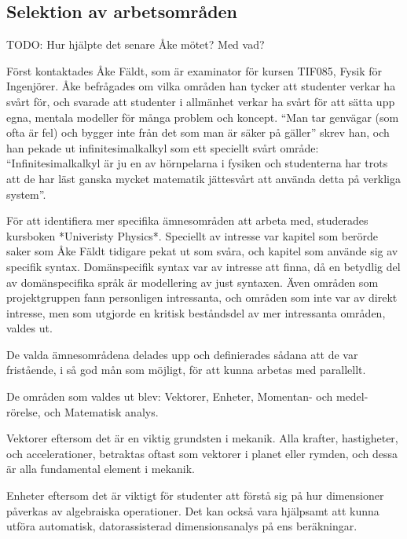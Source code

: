 \begin{binge}
\section{Selektion av arbetsområden}

TODO: Hur hjälpte det senare Åke mötet? Med vad?

\begin{draft}
  Först kontaktades Åke Fäldt, som är examinator för kursen TIF085,
  Fysik för Ingenjörer. Åke befrågades om vilka områden han tycker att
  studenter verkar ha svårt för, och svarade att studenter i allmänhet
  verkar ha svårt för att sätta upp egna, mentala modeller för många
  problem och koncept. ``Man tar genvägar (som ofta är fel) och bygger
  inte från det som man är säker på gäller'' skrev han, och han pekade
  ut infinitesimalkalkyl som ett speciellt svårt område:
  ``Infinitesimalkalkyl är ju en av hörnpelarna i fysiken och
  studenterna har trots att de har läst ganska mycket matematik
  jättesvårt att använda detta på verkliga system''.

  För att identifiera mer specifika ämnesområden att arbeta med,
  studerades kursboken *Univeristy Physics*. Speciellt av intresse var
  kapitel som berörde saker som Åke Fäldt tidigare pekat ut som svåra,
  och kapitel som använde sig av specifik syntax. Domänspecifik syntax
  var av intresse att finna, då en betydlig del av domänspecifika språk
  är modellering av just syntaxen. Även områden som projektgruppen fann
  personligen intressanta, och områden som inte var av direkt intresse,
  men som utgjorde en kritisk beståndsdel av mer intressanta områden,
  valdes ut.

  De valda ämnesområdena delades upp och definierades sådana att de var
  fristående, i så god mån som möjligt, för att kunna arbetas med
  parallellt.

  De områden som valdes ut blev: Vektorer, Enheter, Momentan- och
  medel-rörelse, och Matematisk analys.

  Vektorer eftersom det är en viktig grundsten i mekanik. Alla krafter,
  hastigheter, och accelerationer, betraktas oftast som vektorer i
  planet eller rymden, och dessa är alla fundamental element i
  mekanik.

  Enheter eftersom det är viktigt för studenter att förstå sig på hur
  dimensioner påverkas av algebraiska operationer. Det kan också vara
  hjälpsamt att kunna utföra automatisk, datorassisterad
  dimensionsanalys på ens beräkningar.


\end{draft}
\end{binge}
